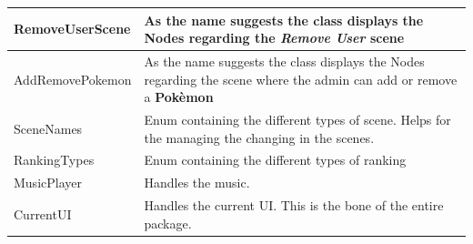 \begin{center}
\begin{longtable}{| m{14em} | m{19em} |}
		\hline
		RemoveUserScene & As the name suggests the class displays the Nodes regarding the \textit{Remove User} scene\\
		\hline
		AddRemovePokemon & As the name suggests the class displays the Nodes regarding the scene where the admin can add or remove a \textbf{Pokèmon}\\
		\hline
		SceneNames & Enum containing the different types of scene. Helps for the managing the changing in the scenes.\\
		\hline
		RankingTypes & Enum containing the different types of ranking\\
		\hline
		MusicPlayer & Handles the music.\\
		\hline
		CurrentUI & Handles the current UI. This is the bone of the entire package.\\
		\hline
	\end{longtable}
\end{center}
\endgroup
